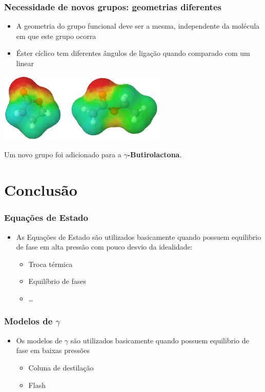 \documentclass[aspectratio=169]{beamer}
\begin{document}
\begin{frame}
  \frametitle{Necessidade de novos grupos: geometrias diferentes}
  \begin{itemize}
    \item A geometria do grupo funcional deve ser a mesma, independente da
    molécula em que este grupo ocorra
    \item Éster cíclico tem diferentes ângulos de ligação quando comparado com
    um linear
  \end{itemize}
  \begin{center}
  \includegraphics[width=0.6\textwidth]{img/ester_2}
  \end{center}
  \begin{footnotesize}
  Um novo grupo foi adicionado para a \textbf{$\gamma$-Butirolactona}.
  \end{footnotesize}
\end{frame}

\section{Conclusão} 

\begin{frame}
  \frametitle{Equações de Estado}

  \begin{itemize}
    \item As Equações de Estado são utilizados basicamente quando possuem
   	equilibrio de fase em alta pressão com pouco desvio da idealidade:
    \begin{itemize}
      \item Troca térmica
      \item Equilíbrio de fases
      \item \ldots
    \end{itemize}
    \end{itemize}
\end{frame}

\begin{frame}
  \frametitle{Modelos de $\gamma$}

  \begin{itemize}
    \item Os modelos de $\gamma$ são utilizados basicamente quando possuem
   	equilibrio de fase em baixas pressões
    \begin{itemize}
      \item Coluna de destilação
      \item Flash
    \end{itemize}
    \end{itemize}
\end{frame}
\end{document}
